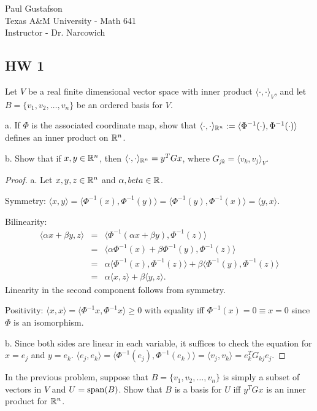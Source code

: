 \documentclass{article}
\begin{document}
\noindent Paul Gustafson\\
\noindent Texas A\&M University - Math 641\\ 
\noindent Instructor - Dr. Narcowich

\subsection*{HW 1}
 Let $V$ be a real finite dimensional vector space with inner product $\langle \cdot, \cdot \rangle_V$, and let $B = \{v_1, v_2, \ldots, v_n\}$ be an ordered basis for $V$.

a. If $\Phi$ is the associated coordinate map, show that $\langle \cdot, \cdot \rangle_{\mathbb{R}^n} := \langle \Phi^{-1}(\cdot) , \Phi^{-1}(\cdot)\rangle$ defines an inner product on $\mathbb{R}^n$.

b. Show that if $x, y \in \mathbb{R}^n$, then $\langle \cdot, \cdot \rangle_{\mathbb{R}^n}  = y^TGx$, where $G_{jk} = \langle v_k, v_j\rangle_V$.

\begin{proof}
a. Let $x,y,z \in \mathbb{R}^n$ and $\alpha, beta \in \mathbb{R}$.

Symmetry: $\langle x, y \rangle = \langle \Phi^{-1}(x), \Phi^{-1}(y) \rangle = \langle \Phi^{-1}(y), \Phi^{-1}(x) \rangle = \langle y, x \rangle$.

Bilinearity: 
\begin{align*}
\langle \alpha x + \beta y, z \rangle & = &
\langle \Phi^{-1}(\alpha x + \beta y), \Phi^{-1}(z) \rangle \\ &= &
\langle \alpha \Phi^{-1}(x) + \beta \Phi^{-1}(y), \Phi^{-1}(z) \rangle \\ &= &
\alpha \langle  \Phi^{-1}(x), \Phi^{-1}(z) \rangle + \beta \langle  \Phi^{-1}(y), \Phi^{-1}(z) \rangle \\ &= &
\alpha \langle x, z \rangle + \beta \langle y, z \rangle.
\end{align*}
Linearity in the second component follows from symmetry.

Positivity: $\langle x, x \rangle 
= \langle \Phi^{-1} x, \Phi^{-1} x \rangle
\ge 0$
with equality iff $\Phi^{-1}(x) = 0 \equiv x = 0$ since $\Phi$ is an isomorphism.

b. Since both sides are linear in each variable, it suffices to check the equation for $x = e_j$ and $y = e_k$.  $\langle e_j, e_k \rangle = \langle \Phi^{-1}(e_j), \Phi^{-1}(e_k) \rangle = \langle v_j, v_k \rangle = e_k^T G_{kj} e_j$.
\end{proof}

 In the previous problem, suppose that $B = \{v_1, v_2, \ldots, v_n \}$ is simply a subset of vectors in $V$ and $U = \operatorname{span}(B)$. Show that $B$ is a basis for $U$ iff $y^T G x$ is an inner product for $\mathbb{R}^n$.
\end{document}
